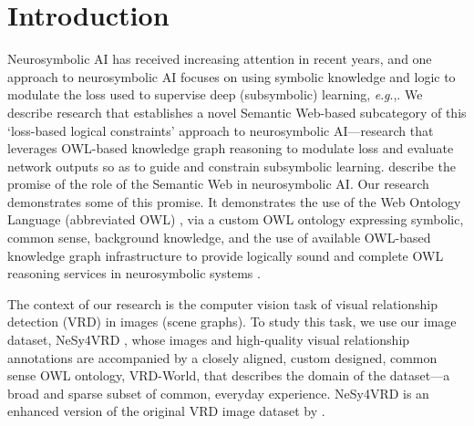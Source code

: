 \documentclass[]{jair}
\newcommand{\eg}{\textit{e}.\textit{g}.,\xspace}
\newcommand{\ejr}[2][]{\todo[inline,bordercolor=blue,color=pink!25, #1]{EJR: {\footnotesize #2}}}
\begin{document}



\maketitle

\section{Introduction}

Neurosymbolic AI has received increasing attention in recent years, and one approach to neurosymbolic AI focuses on using symbolic knowledge and logic to modulate the loss used to supervise deep (subsymbolic) learning, \eg \citet{DBLP:conf/nesy/SerafiniG16,DBLP:journals/jair/GiunchigliaL21,Giunchiglia2023}.
We describe research that establishes a novel Semantic Web-based subcategory of this `loss-based logical constraints' approach to neurosymbolic AI---research that leverages OWL-based knowledge graph reasoning to modulate loss and evaluate network outputs so as to guide and constrain subsymbolic learning.
\citet{DBLP:journals/semweb/HitzlerBES20} describe the promise of the role of the Semantic Web in neurosymbolic AI.
Our research demonstrates some of this promise.
It demonstrates the use of the Web Ontology Language (abbreviated OWL) \cite{OWL2:Primer}, via a custom OWL ontology expressing symbolic, common sense, background knowledge, and the use of available OWL-based knowledge graph infrastructure to provide logically sound and complete OWL reasoning services in neurosymbolic systems \cite{DBLP:conf/ore/MatentzogluLHSP15,DBLP:journals/corr/abs-2309-06888}.

The context of our research is the computer vision task of visual relationship detection (VRD) in images (scene graphs).
To study this task, we use our image dataset, NeSy4VRD \cite{Herron/2023/nesy4vrd}, whose images and high-quality visual relationship annotations are accompanied by a closely aligned, custom designed, common sense OWL ontology, VRD-World, that describes the domain of the dataset---a broad and sparse subset of common, everyday experience. 
NeSy4VRD is an enhanced version of the original VRD image dataset by \citet{lu2016visual}.
\end{document}
